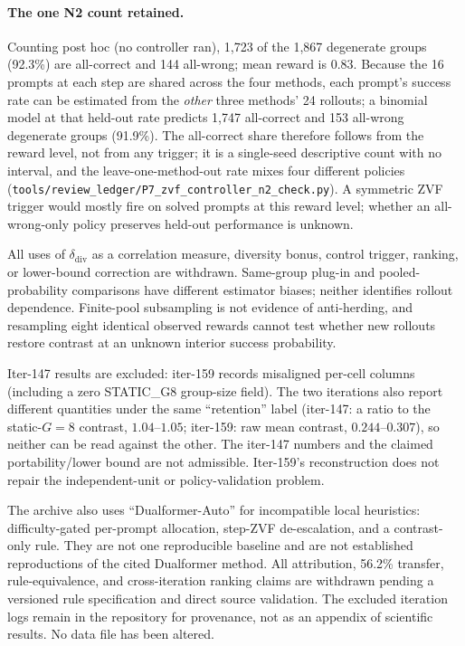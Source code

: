 \documentclass{article}
\begin{document}
\paragraph{The one N2 count retained.} Counting post hoc (no controller ran),
1,723 of the 1,867 degenerate groups (92.3\%) are all-correct and 144
all-wrong; mean reward is $0.83$. Because the 16 prompts at each step are
shared across the four methods, each prompt's success rate can be estimated
from the \emph{other} three methods' 24 rollouts; a binomial model at that
held-out rate predicts 1,747 all-correct and 153 all-wrong degenerate groups
(91.9\%). The all-correct share therefore follows from the reward level, not
from any trigger; it is a single-seed descriptive count with no interval, and
the leave-one-method-out rate mixes four different policies
(\texttt{tools/review\_ledger/P7\_zvf\_controller\_n2\_check.py}). A symmetric
ZVF trigger would mostly fire on solved prompts at this reward level; whether
an all-wrong-only policy preserves held-out performance is unknown.

All uses of $\delta_{\mathrm{div}}$ as a correlation measure, diversity bonus,
control trigger, ranking, or lower-bound correction are withdrawn. Same-group
plug-in and pooled-probability comparisons have different estimator biases;
neither identifies rollout dependence. Finite-pool subsampling is not evidence
of anti-herding, and resampling eight identical observed rewards cannot test
whether new rollouts restore contrast at an unknown interior success probability.

Iter-147 results are excluded: iter-159 records misaligned per-cell columns
(including a zero STATIC\_G8 group-size field). The two iterations also report
different quantities under the same ``retention'' label (iter-147: a ratio to
the static-$G{=}8$ contrast, $1.04$--$1.05$; iter-159: raw mean contrast,
$0.244$--$0.307$), so neither can be read against the other. The iter-147
numbers and the claimed portability/lower bound are not admissible. Iter-159's reconstruction
does not repair the independent-unit or policy-validation problem.

The archive also uses ``Dualformer-Auto'' for incompatible local heuristics:
difficulty-gated per-prompt allocation, step-ZVF de-escalation, and a
contrast-only rule. They are not one reproducible baseline and are not
established reproductions of the cited Dualformer method. All attribution,
56.2\% transfer, rule-equivalence, and cross-iteration ranking claims are
withdrawn pending a versioned rule specification and direct source validation.
The excluded iteration logs remain in the repository for provenance, not as
an appendix of scientific results. No data file has been altered.




\appendix



\end{document}
